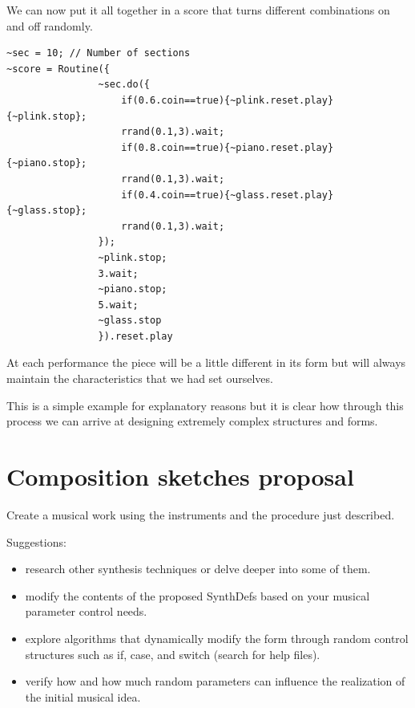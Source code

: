 We can now put it all together in a score that turns different combinations on and off randomly.

\begin{lstlisting}[frame=single] 
~sec = 10; // Number of sections
~score = Routine({
                ~sec.do({
                    if(0.6.coin==true){~plink.reset.play}{~plink.stop};
                    rrand(0.1,3).wait;
                    if(0.8.coin==true){~piano.reset.play}{~piano.stop};
                    rrand(0.1,3).wait;
                    if(0.4.coin==true){~glass.reset.play}{~glass.stop};
                    rrand(0.1,3).wait;
                });
                ~plink.stop;
                3.wait;
                ~piano.stop;
                5.wait;
                ~glass.stop
                }).reset.play
\end{lstlisting}

At each performance the piece will be a little different in its form but will always maintain the characteristics that we had set ourselves.

This is a simple example for explanatory reasons but it is clear how through this process we can arrive at designing extremely complex structures and forms.

\section{Composition sketches proposal}\label{composition-sketches-proposal}

Create a musical work using the instruments and the procedure just described.

Suggestions: 

\begin{itemize}
\tightlist
\item research other synthesis techniques or delve deeper into some of them. 
\item modify the contents of the proposed SynthDefs based on your musical parameter control needs. 
\item explore algorithms that dynamically modify the form through random control structures such as if, case, and switch (search for help files). 
\item verify how and how much random parameters can influence the realization of the initial musical idea.
\end{itemize}